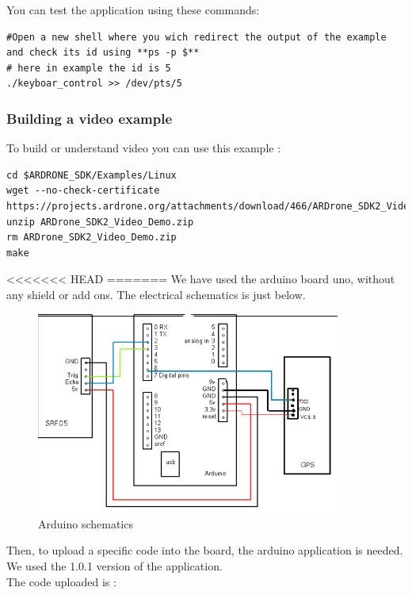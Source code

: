 You can test the application using these commands:
\begin{lstlisting}
#Open a new shell where you wich redirect the output of the example and check its id using **ps -p $**
# here in example the id is 5
./keyboar_control >> /dev/pts/5
\end{lstlisting}

\subsubsection{Building a video example}
To build or understand video you can use this example :
\begin{lstlisting}
cd $ARDRONE_SDK/Examples/Linux
wget --no-check-certificate https://projects.ardrone.org/attachments/download/466/ARDrone_SDK2_Video_Demo.zip
unzip ARDrone_SDK2_Video_Demo.zip
rm ARDrone_SDK2_Video_Demo.zip
make
\end{lstlisting}

<<<<<<< HEAD
=======
We have used the arduino board uno, without any shield or add ons. The electrical schematics is just below.\\

\begin{figure}[!h] 
\begin{center}
\includegraphics[width=10cm]{imgs/Capture-1.png}
\caption{Arduino schematics} 
\label{img1} 
\end{center}
\end{figure} 

Then, to upload a specific code into the board, the arduino application is needed. We used the 1.0.1 version of the application.\\

The code uploaded is :\\

